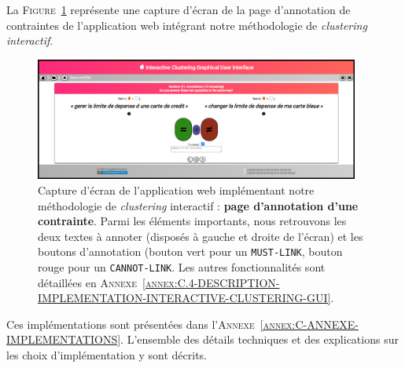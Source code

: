 		
		\begin{leftBarExamples}
			La \textsc{Figure~\ref{figure:3.2.3-DESCRIPTION-TECHNIQUE-IMPLEMENTATION-EXEMPLE}} représente une capture d'écran de la page d'annotation de contraintes de l'application web intégrant notre méthodologie de \textit{clustering interactif}.
			
			\begin{figure}[H]
				\centering
				\includegraphics[width=0.95\textwidth]{figures/interactive-clustering-application-annotation-0small}
				\caption{
					Capture d'écran de l'application web implémentant notre méthodologie de \textit{clustering} interactif : \textbf{page d'annotation d'une contrainte}.
					Parmi les éléments importants, nous retrouvons les deux textes à annoter (disposés à gauche et droite de l'écran) et les boutons d'annotation (bouton vert pour un \texttt{MUST-LINK}, bouton rouge pour un \texttt{CANNOT-LINK}.
					Les autres fonctionnalités sont détaillées en \textsc{Annexe~\ref{annex:C.4-DESCRIPTION-IMPLEMENTATION-INTERACTIVE-CLUSTERING-GUI}}.
				}
				\label{figure:3.2.3-DESCRIPTION-TECHNIQUE-IMPLEMENTATION-EXEMPLE}
			\end{figure}
		\end{leftBarExamples}
		
		\begin{leftBarInformation}
			Ces implémentations sont présentées dans l'\textsc{Annexe~\ref{annex:C-ANNEXE-IMPLEMENTATIONS}}.
			L'ensemble des détails techniques et des explications sur les choix d'implémentation y sont décrits.
		\end{leftBarInformation}